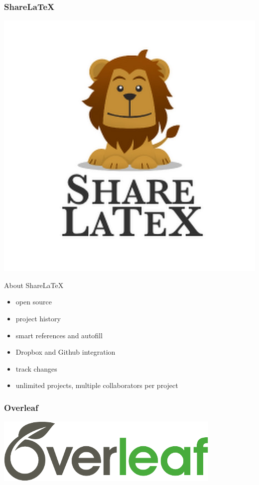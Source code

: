 \documentclass[12pt, compress]{beamer}
\begin{document}
\begin{frame}[fragile]
  \frametitle{Share\LaTeX}
  \begin{center}\includegraphics[scale=0.25]{images/sharelatex.jpg}\end{center}
\end{frame}
  
\begin{frame}{About Share\LaTeX}
    \begin{itemize}
        \item open source 
        \item project history 
        \item smart references and autofill
        \item Dropbox and Github integration 
        \item track changes 
        \item unlimited projects, multiple collaborators per project
    \end{itemize}
\end{frame}

\begin{frame}[fragile]
    \frametitle{Overleaf}
        \begin{center}\includegraphics[scale=0.5]{images/overleaf.png}\end{center}
\end{frame}
    
\end{document}
